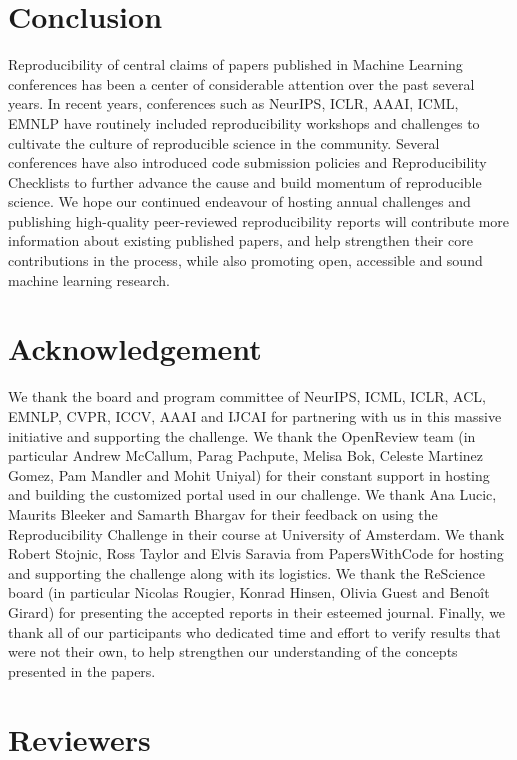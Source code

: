 \section{Conclusion}

Reproducibility of central claims of papers published in Machine Learning conferences has been a center of considerable attention over the past several years. In recent years, conferences such as NeurIPS, ICLR, AAAI, ICML, EMNLP have routinely included reproducibility
workshops and challenges to cultivate the culture of reproducible science in the community. Several conferences have also introduced code submission policies and Reproducibility Checklists to further advance the cause and build momentum of reproducible science. We hope our continued endeavour of hosting annual challenges and publishing high-quality peer-reviewed reproducibility reports will contribute more information about existing published papers, and help strengthen their core contributions in the process, while also promoting open, accessible and sound machine learning research.

\section{Acknowledgement}

We thank the board and program committee of NeurIPS, ICML, ICLR, ACL, EMNLP, CVPR, ICCV, AAAI and IJCAI for partnering with us in this massive initiative and supporting the challenge. We thank the OpenReview team (in particular Andrew McCallum, Parag Pachpute, Melisa Bok, Celeste Martinez Gomez, Pam Mandler and Mohit Uniyal) for their constant support in hosting and building the customized portal used in our challenge. We thank Ana Lucic, Maurits Bleeker and Samarth Bhargav for their feedback on using the Reproducibility Challenge in their course at University of Amsterdam. We thank Robert Stojnic, Ross Taylor and Elvis Saravia from PapersWithCode for hosting and supporting the challenge along with its logistics. We thank the ReScience board (in particular Nicolas Rougier, Konrad Hinsen, Olivia Guest and Benoît Girard)
for presenting the accepted reports in their esteemed journal. Finally, we thank all of our participants who dedicated time and effort to verify results that were not their own, to help strengthen our understanding of the concepts presented in the papers.

\section{Reviewers}

